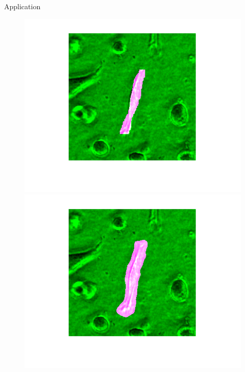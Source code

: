 \documentclass[aspectratio=169,xcolor=dvipsnames]{beamer}
\begin{document}
\begin{frame}[fragile]{Application}
\begin{figure}
\begin{minipage}{0.25\linewidth}
	\includegraphics[width=\linewidth]{n25_GT.png}
\end{minipage}\hfill
\begin{minipage}{0.25\linewidth}
	\includegraphics[width=\linewidth]{n25_seg.png}
\end{minipage}\hfill
\begin{minipage}{0.25\linewidth}

\end{minipage}
\end{figure}
\end{frame}
\end{document}
